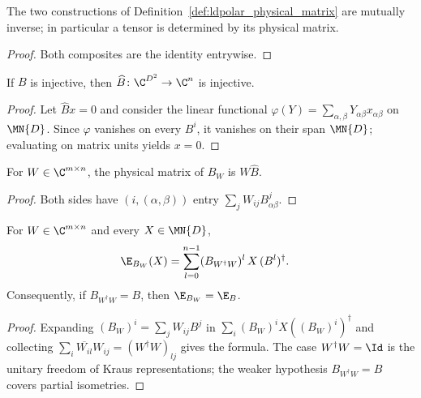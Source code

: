 \begin{lemma}
    \label{lem:ldpolar_physical_matrix_bij}
    \leanok
    The two constructions of Definition~\ref{def:ldpolar_physical_matrix}
    are mutually inverse; in particular a tensor is determined by its
    physical matrix.
\end{lemma}
\begin{proof}
    \leanok
    Both composites are the identity entrywise.
\end{proof}

\begin{lemma}
    \label{thm:ldpolar_injective_physical}
    \leanok
    If $B$ is injective, then $\widehat B\colon\C^{D^2}\to\C^n$ is
    injective.
\end{lemma}
\begin{proof}
    \leanok
    Let $\widehat Bx=0$ and consider the linear functional
    $\varphi(Y)=\sum_{\alpha,\beta}Y_{\alpha\beta}x_{\alpha\beta}$ on
    $\MN{D}$. Since $\varphi$ vanishes on every $B^i$, it vanishes on their span
    $\MN{D}$; evaluating on matrix units yields $x=0$.
\end{proof}

\begin{lemma}
    \label{lem:ldpolar_physical_matrix_rotate}
    \leanok
    For $W\in\C^{m\times n}$, the physical matrix of $B_W$ is
    $W\widehat B$.
\end{lemma}
\begin{proof}
    \leanok
    Both sides have $(i,(\alpha,\beta))$ entry
    $\sum_jW_{ij}B^j_{\alpha\beta}$.
\end{proof}

\begin{lemma}
    \label{thm:ldpolar_transfer_rotate}
    \leanok
    For $W\in\C^{m\times n}$ and every $X\in\MN{D}$,
    \begin{align}
        \E_{B_W}(X)
         & =\sum_{l=0}^{n-1}(B_{W^\dagger W})^l\,X\,(B^l)^\dagger.
        \notag
    \end{align}
    Consequently, if $B_{W^\dagger W}=B$, then $\E_{B_W}=\E_B$.
\end{lemma}
\begin{proof}
    \leanok
    Expanding $(B_W)^i=\sum_jW_{ij}B^j$ in
    $\sum_i(B_W)^iX((B_W)^i)^\dagger$ and collecting
    $\sum_i\overline{W_{il}}W_{ij}=(W^\dagger W)_{lj}$ gives the formula. The case
    $W^\dagger W=\Id$ is the unitary freedom of Kraus representations; the
    weaker hypothesis $B_{W^\dagger W}=B$ covers partial isometries.
\end{proof}

